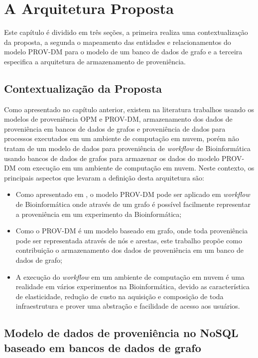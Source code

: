 \chapter{A Arquitetura Proposta}

Este capítulo é dividido em três seções, a primeira realiza uma contextualização da proposta, a segunda o mapeamento das entidades e relacionamentos do modelo PROV-DM para o modelo de um banco de dados de grafo e a terceira especifica a arquitetura de armazenamento de proveniência.

\section{Contextualização da Proposta}

Como apresentado no capítulo anterior, existem na literatura trabalhos usando os modelos de proveniência OPM e PROV-DM, armazenamento dos dados de proveniência em bancos de dados de grafos e proveniência de dados para processos executados em um ambiente de computação em nuvem, porém não tratam de um modelo de dados para proveniência de \textit{workflow} de Bioinformática usando bancos de dados de grafos para armazenar os dados do modelo PROV-DM com execução em um ambiente de computação em nuvem. Neste contexto, os principais aspectos que levaram a definição desta arquitetura são:

\begin{itemize}
\item Como apresentado em \cite{renato}, o modelo PROV-DM pode ser aplicado em \textit{workflow} de Bioinformática onde através de um grafo é possível facilmente representar a proveniência em um experimento da Bioinformática;
\item Como o PROV-DM é um modelo baseado em grafo, onde toda proveniência pode ser representada através de nós e arestas, este trabalho propõe como contribuição o armazenamento dos dados de proveniência em um banco de dados de grafo;
\item A execução do \textit{workflow} em um ambiente de computação em nuvem é uma realidade em vários experimentos na Bioinformática, devido as característica de elasticidade, redução de custo na aquisição e composição de toda infraestrutura e prover uma abstração e facilidade de acesso aos usuários.
\end{itemize}

\section{Modelo de dados de proveniência no NoSQL baseado em bancos de dados de grafo}

